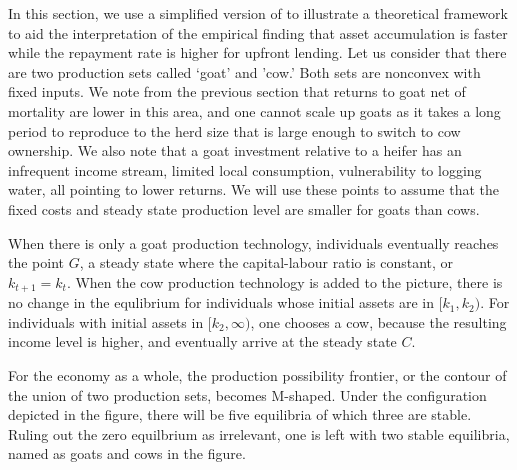 \hspace{-3em}

	In this section, we use a simplified version of \citet{GalorZeira1993} to illustrate a theoretical framework to aid the interpretation of the empirical finding that asset accumulation is faster while the repayment rate is higher for upfront lending. Let us consider that there are two production sets called `goat' and 'cow.' Both sets are nonconvex with fixed inputs. We note from the previous section that returns to goat net of mortality are lower in this area, and one cannot scale up goats as it takes a long period to reproduce to the herd size that is large enough to switch to cow ownership. We also note that a goat investment relative to a heifer has an infrequent income stream, limited local consumption, vulnerability to logging water, all pointing to lower returns. We will use these points to assume that the fixed costs and steady state production level are smaller for goats than cows. 
	
	When there is only a goat production technology, individuals eventually reaches the point $G$, a steady state where the capital-labour ratio is constant, or $k_{t+1}=k_{t}$. When the cow production technology is added to the picture, there is no change in the equlibrium for individuals whose initial assets are in $[k_{1}, k_{2})$. For individuals with initial assets in $[k_{2}, \infty)$, one chooses a cow, because the resulting income level is higher, and eventually arrive at the steady state $C$. 

	For the economy as a whole, the production possibility frontier, or the contour of the union of two production sets, becomes M-shaped. Under the configuration depicted in the figure, there will be five equilibria of which three are stable. Ruling out the zero equilbrium as irrelevant, one is left with two stable equilibria, named as goats and cows in the figure. 
	
